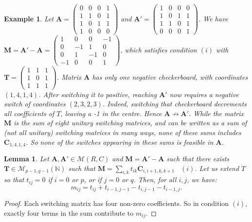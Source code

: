 \documentclass{article}
\newtheorem{lemma}{Lemma}
\newtheorem{example}{Example}
\newcommand{\N}{\mathbb{N}}
\newcommand{\MM}{\mathcal M}
\newcommand{\rar}{\rightarrow}
\newcommand{\A}{\mathbf A}
\newcommand{\C}{\mathbf C}
\newcommand{\M}{\mathbf M}
\newcommand{\T}{\mathbf T}
\begin{document}
\begin{example}\label{ex2}
Let $\A=\begin{pmatrix}
0 & 0 & 0 & 1 \\
1 & 1 & 0 & 1 \\
1 & 0 & 1 & 1 \\
1 & 0 & 0 & 0
\end{pmatrix}$ and $\A'=\begin{pmatrix}
1 & 0 & 0 & 0 \\
1 & 0 & 1 & 1 \\
1 & 1 & 0 & 1 \\
0 & 0 & 0 & 1
\end{pmatrix}$.
We have $\M=\A'-\A=\begin{pmatrix}
1 & 0 & 0 & -1 \\
0 & -1 & 1 & 0 \\
0 & 1 & -1 & 0 \\
-1 & 0 & 0 & 1
\end{pmatrix}$, which satisfies condition $(i)$ with \\
$\T=\begin{pmatrix}
1 & 1 & 1  \\
1 & 0 & 1  \\
1 & 1 & 1
\end{pmatrix}$. Matrix $\A$ has only one negative checkerboard, with coordinates $(1,4,1,4)$. After switching it to positive, reaching $\A'$ now requires a negative switch of coordinates $(2,3,2,3)$. Indeed, switching that checkerboard decrements all coefficients of $T$, leaving a -1 in the centre. Hence $\A\not\rar \A'$. While the matrix $\M$ is the sum of eight unitary switching matrices, and can be written as a sum of (not all unitary) switching matrices in many ways, none of these sums includes $\C_{1,4,1,4}$. So none of the switches appearing in these sums is feasible in $\A$. 
\end{example}




\begin{lemma}\label{m_ij}
Let $\A,\A' \in \MM(R,C)$ and $\M=\A'-\A$ such that there exists $\T\in \MM_{p-1,q-1}(\N)$ such that $\M=\sum_{i,k} t_{ik}\C_{i,i+1,k,k+1}$ ~$(i)$. Let us extend $T$ so that $t_{ij}=0$ if $i=0$ or $p$, or if $j=0$ or $q$. Then, for all $i,j$, we have:  $$m_{ij}=t_{ij}+t_{i-1,j-1}-t_{i,j-1}-t_{i-1,j}.$$ 
\end{lemma}

\begin{proof}
Each switching matrix has four non-zero coefficients. So in condition $(i)$, exactly four terms in the sum contribute to $m_{ij}$.
\end{proof}
\end{document}
